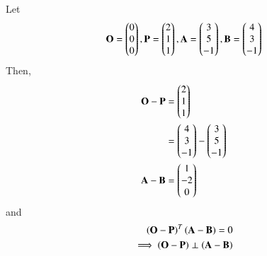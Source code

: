 Let 
\begin{align}
 \vec{O}=\myvec{0\\0\\0}, 
 \vec{P}=\myvec{2\\1\\1} ,\vec{A}=\myvec{3\\5\\-1} ,\vec{B}=\myvec{4\\3\\-1}  
\end{align}
Then,
\begin{align}
\vec{O}-\vec{P}&=\myvec{2\\1\\1}
\\
&=\myvec{4\\3\\-1}-\myvec{3\\5\\-1}
\\
\vec{A}-\vec{B}&=\myvec{1\\-2\\0}
\end{align}
and 
\begin{align}
\brak{\vec{O}-\vec{P}}^T(\vec{A}-\vec{B})=0
\\
\implies \brak{\vec{O}-\vec{P}} \perp \brak{\vec{A}-\vec{B}}
\end{align}